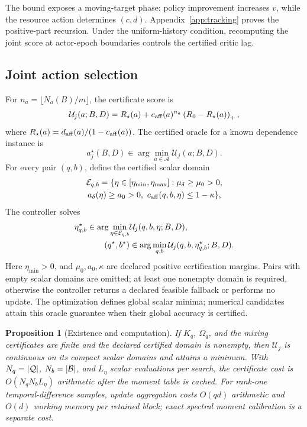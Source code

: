 \documentclass[journal]{IEEEtran}
\newtheorem{proposition}{Proposition}
\newcommand{\A}{\mathcal{A}}
\begin{document}
The bound exposes a moving-target phase: policy improvement increases $v$, while the resource action determines $(c,d)$.
Appendix~\ref{app:tracking} proves the positive-part recursion.
Under the uniform-history condition, recomputing the joint score at actor-epoch boundaries controls the certified critic lag.

\subsection{Joint action selection}
For $n_a=\lfloor N_a(B)/m\rfloor$, the certificate score is
\begin{equation}
\mathcal{U}_j(a;B,D)=R_\star(a)+c_{\rm aff}(a)^{n_a}\left(R_0-R_\star(a)\right)_+,
\label{eq:certificate-score}
\end{equation}
where $R_\star(a)=d_{\rm aff}(a)/(1-c_{\rm aff}(a))$.
The certified oracle for a known dependence instance is
\begin{equation}
a_j^\star(B,D)\in\arg\min_{a\in\A}\mathcal{U}_j(a;B,D).
\label{eq:catalogue-oracle}
\end{equation}
For every pair $(q,b)$, define the certified scalar domain
\begin{multline}
{\cal E}_{q,b}=\{\eta\in[\eta_{\min},\eta_{\max}]:
\mu_\delta\ge\mu_0>0,\\
a_\delta(\eta)\ge a_0>0,\ c_{\rm aff}(q,b,\eta)\le1-\kappa\},
\label{eq:certified-step-domain}
\end{multline}
The controller solves
\begin{align}
\eta_{q,b}^\star\in\arg\min_{\eta\in{\cal E}_{q,b}}
&\mathcal U_j(q,b,\eta;B,D),\nonumber\\
(q^\star,b^\star)&\in\arg\min_{q,b}
\mathcal U_j(q,b,\eta_{q,b}^\star;B,D).
\label{eq:mixed-controller}
\end{align}
Here $\eta_{\min}>0$, and $\mu_0,a_0,\kappa$ are declared positive certification margins.
Pairs with empty scalar domains are omitted; at least one nonempty domain is required, otherwise the controller returns a declared feasible fallback or performs no update.
The optimization defines global scalar minima; numerical candidates attain this oracle guarantee when their global accuracy is certified.

\begin{proposition}[Existence and computation]
If $K_q$, $\Omega_q$, and the mixing certificates are finite and the declared certified domain is nonempty, then $\mathcal U_j$ is continuous on its compact scalar domains and attains a minimum.
With $N_q=|{\cal Q}|$, $N_b=|{\cal B}|$, and $L_\eta$ scalar evaluations per search, the certificate cost is $O(N_qN_bL_\eta)$ arithmetic after the moment table is cached.
For rank-one temporal-difference samples, update aggregation costs $O(qd)$ arithmetic and $O(d)$ working memory per retained block; exact spectral moment calibration is a separate cost.
\label{prop:computation}
\end{proposition}
\end{document}
